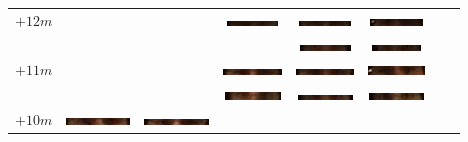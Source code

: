 \begin{tabular}{|c|c|c|c|c|c|c|c|}
\hline 
$+12m$&&&
\includegraphics[width=0.115\linewidth]{Auge1/A_Img12-3FalkoE.png} &
\includegraphics[width=0.115\linewidth]{Auge1/A_Img12-4FalkoE.png}  &
\includegraphics[width=0.115\linewidth]{Auge1/A_Img12-5FalkoE.png} && \\ 
&&&&
\includegraphics[width=0.115\linewidth]{Auge1/A_Img12-4ThomasE.png}  &
\includegraphics[width=0.115\linewidth]{Auge1/A_Img12-5ThomasE.png} && \\ \hline 
$+11m$&&&
\includegraphics[width=0.115\linewidth]{Auge1/A_Img11-3FalkoE.png} &
\includegraphics[width=0.115\linewidth]{Auge1/A_Img11-4FalkoE.png} &
\includegraphics[width=0.115\linewidth]{Auge1/A_Img11-5FalkoE.png} &
&
\\
&&&
\includegraphics[width=0.115\linewidth]{Auge1/A_Img11-3ThomasE.png} &
\includegraphics[width=0.115\linewidth]{Auge1/A_Img11-4ThomasE.png} &
\includegraphics[width=0.115\linewidth]{Auge1/A_Img11-5ThomasE.png} &
&\\\hline 
$+10m$&
\includegraphics[width=0.115\linewidth]{Auge1/A_Img10-1FalkoE.png} &
\includegraphics[width=0.115\linewidth]{Auge1/A_Img10-2FalkoE.png} &

\end{tabular}
